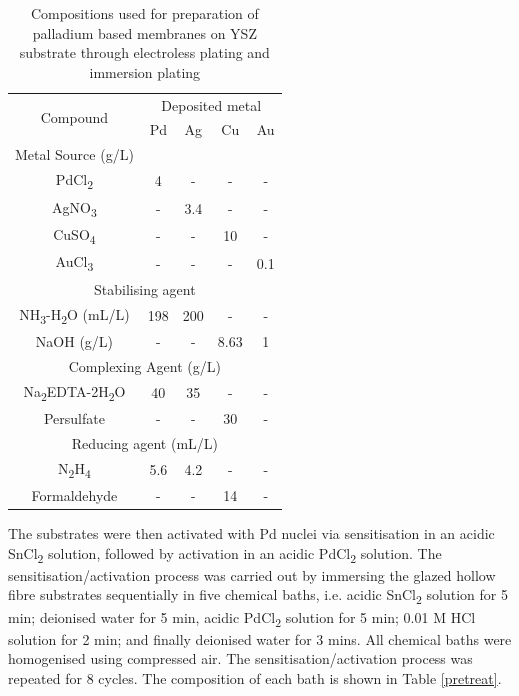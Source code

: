 \begin{table}[]
    \centering
    \caption{Compositions used for preparation of palladium based membranes on YSZ substrate through electroless plating and immersion plating}
    \label{ELP}
    \begin{tabular}{@{}ccccc@{}}
    \toprule
    \multirow{2}{*}{Compound} & \multicolumn{4}{c}{Deposited metal} \\
                              & Pd      & Ag     & Cu      & Au     \\ \midrule
    Metal Source (g/L)        &         &        &         &        \\ \midrule
    PdCl\textsubscript{2}                     & 4       & -      & -       & -      \\
    AgNO\textsubscript{3}                     & -       & 3.4    & -       & -      \\
    CuSO\textsubscript{4}                     & -       & -      & 10      & -      \\
    AuCl\textsubscript{3}                     & -       & -      & -       & 0.1    \\ \midrule
    \multicolumn{5}{c}{Stabilising agent}                           \\ \midrule
    NH\textsubscript{3}-H\textsubscript{2}O (mL/L)            & 198     & 200    & -       & -      \\
    NaOH (g/L)                & -       & -      & 8.63    & 1      \\ \midrule
    \multicolumn{5}{c}{Complexing Agent (g/L)}                      \\ \midrule
    Na\textsubscript{2}EDTA-2H\textsubscript{2}O              & 40      & 35     & -       & -      \\
    Persulfate                & -       & -      & 30      & -      \\ \midrule
    \multicolumn{5}{c}{Reducing agent (mL/L)}                       \\ \midrule
    N\textsubscript{2}H\textsubscript{4}                      & 5.6     & 4.2    & -       & -      \\
    Formaldehyde              & -       & -      & 14      & -      \\ \bottomrule
    \end{tabular}
    \end{table}

The substrates were then activated with Pd nuclei via sensitisation in an acidic SnCl\textsubscript{2} solution, followed by activation in an acidic PdCl\textsubscript{2} solution. The sensitisation/activation 
process was carried out by immersing the glazed hollow fibre substrates sequentially in five chemical baths, i.e. acidic SnCl\textsubscript{2} solution for 5 min; deionised water for 5 min, acidic PdCl\textsubscript{2} solution for 5 min; 0.01 M HCl solution for 2 min; and finally deionised water for 3 mins. 
All chemical baths were homogenised using compressed air. The sensitisation/activation process was repeated for 8 cycles. The composition of each bath is shown in Table \ref{pretreat}.

